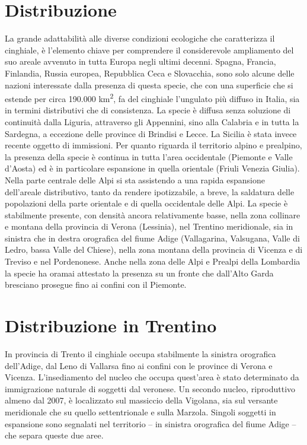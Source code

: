 \begin{multicols}{2}
\section{Distribuzione} La grande adattabilit\`a alle diverse condizioni
ecologiche che caratterizza il cinghiale, \`e
l{\textquoteright}elemento chiave per comprendere il considerevole
ampliamento del suo areale avvenuto in tutta Europa negli ultimi
decenni. Spagna, Francia, Finlandia, Russia europea, Repubblica Ceca e
Slovacchia, sono solo alcune delle nazioni interessate dalla presenza
di questa specie, che con una superficie che si estende per circa
190.000 km\textsuperscript{2}, fa del cinghiale
l{\textquoteright}ungulato pi\`u diffuso in Italia, sia in termini
distributivi che di consistenza. La specie \`e diffusa senza soluzione
di continuit\`a dalla Liguria, attraverso gli Appennini, sino alla
Calabria e in tutta la Sardegna, a eccezione delle province di Brindisi
e Lecce. La Sicilia \`e stata invece recente oggetto di immissioni. Per
quanto riguarda il territorio alpino e prealpino, la presenza della
specie \`e continua in tutta l{\textquoteright}area occidentale
(Piemonte e Valle d{\textquoteright}Aosta) ed \`e in particolare
espansione in quella orientale (Friuli Venezia Giulia). Nella parte
centrale delle Alpi si sta assistendo a una rapida espansione
dell{\textquoteright}areale distributivo, tanto da rendere
ipotizzabile, a breve, la saldatura delle popolazioni della parte
orientale e di quella occidentale delle Alpi. La specie \`e stabilmente
presente, con densit\`a ancora relativamente basse, nella zona
collinare e montana della provincia di Verona (Lessinia), nel Trentino
meridionale, sia in sinistra che in destra orografica del fiume Adige
(Vallagarina, Valsugana, Valle di Ledro, bassa Valle del Chiese), nella
zona montana della provincia di Vicenza e di Treviso e nel Pordenonese.
Anche nella zona delle Alpi e Prealpi della Lombardia la specie ha
oramai attestato la presenza su un fronte che dall{\textquoteright}Alto
Garda bresciano prosegue fino ai confini con il Piemonte. 


\section{Distribuzione in Trentino} In provincia di Trento il cinghiale
occupa stabilmente la sinistra orografica dell{\textquoteright}Adige,
dal Leno di Vallarsa fino ai confini con le province di Verona e
Vicenza. L{\textquoteright}insediamento del nucleo che occupa
quest{\textquoteright}area \`e stato determinato da immigrazione
naturale di soggetti dal veronese. Un secondo nucleo, riproduttivo
almeno dal 2007, \`e localizzato sul massiccio della Vigolana, sia sul
versante meridionale che su quello settentrionale e sulla Marzola.
Singoli soggetti in espansione sono segnalati nel territorio -- in
sinistra orografica del fiume Adige -- che separa queste due aree. 


\end{multicols}
